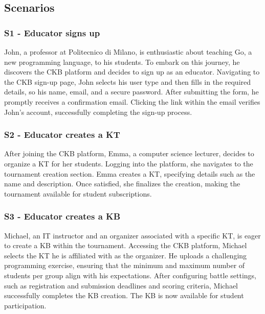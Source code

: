 \documentclass[11pt]{report}
\begin{document}
\subsection{Scenarios}
\subsubsection{S1 - Educator signs up}
    John, a professor at Politecnico di Milano, is enthusiastic about teaching Go, a new programming language, to his students.
    To embark on this journey, he discovers the CKB platform and decides to sign up as an educator.
    Navigating to the CKB sign-up page, John selects his user type and then fills in the required details, so his name, email, and a secure password.
    After submitting the form, he promptly receives a confirmation email.
    Clicking the link within the email verifies John's account, successfully completing the sign-up process.
\subsubsection{S2 - Educator creates a KT}
    After joining the CKB platform, Emma, a computer science lecturer, decides to organize a KT for her students.
    Logging into the platform, she navigates to the tournament creation section.
    Emma creates a KT, specifying details such as the name and description.
    Once satisfied, she finalizes the creation, making the tournament available for student subscriptions.
\subsubsection{S3 - Educator creates a KB}
    Michael, an IT instructor and an organizer associated with a specific KT, is eager to create a KB within the tournament.
    Accessing the CKB platform, Michael selects the KT he is affiliated with as the organizer.
    He uploads a challenging programming exercise, ensuring that the minimum and maximum number of students per group align with his expectations.
    After configuring battle settings, such as registration and submission deadlines and scoring criteria, Michael
    successfully completes the KB creation.
    The KB is now available for student participation.
\end{document}
